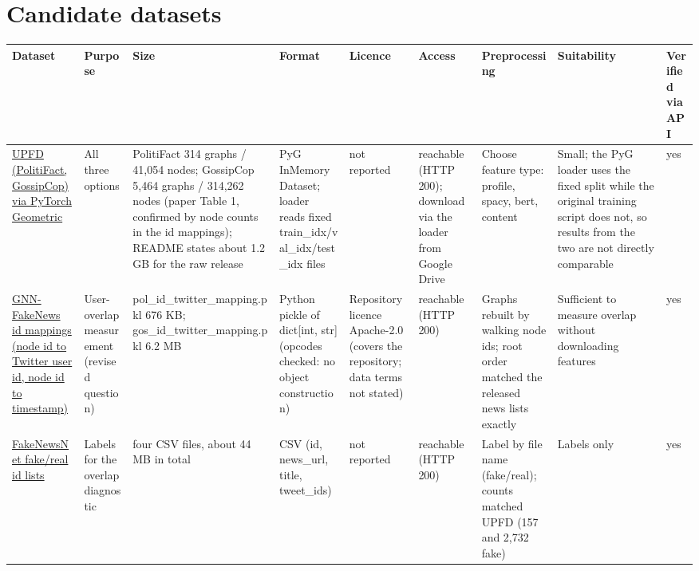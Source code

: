 \documentclass[11pt,a4paper]{article}
\begin{document}
\section{Candidate datasets}

{\small
\begin{longtable}{>{\raggedright\arraybackslash}p{}>{\raggedright\arraybackslash}p{}>{\raggedright\arraybackslash}p{}>{\raggedright\arraybackslash}p{}>{\raggedright\arraybackslash}p{}>{\raggedright\arraybackslash}p{}>{\raggedright\arraybackslash}p{}>{\raggedright\arraybackslash}p{}>{\raggedright\arraybackslash}p{}}
\toprule
\textbf{Dataset} & \textbf{Purpose} & \textbf{Size} & \textbf{Format} & \textbf{Licence} & \textbf{Access} & \textbf{Preprocessing} & \textbf{Suitability} & \textbf{Verified via API} \\
\midrule
\endhead
\href{https://pytorch-geometric.readthedocs.io/en/latest/generated/torch_geometric.datasets.UPFD.html}{UPFD (PolitiFact, GossipCop) via PyTorch Geometric} & All three options & PolitiFact 314 graphs / 41,054 nodes; GossipCop 5,464 graphs / 314,262 nodes (paper Table 1, confirmed by node counts in the id mappings); README states about 1.2 GB for the raw release & PyG InMemoryDataset; loader reads fixed train\_idx/val\_idx/test\_idx files & not reported & reachable (HTTP 200); download via the loader from Google Drive & Choose feature type: profile, spacy, bert, content & Small; the PyG loader uses the fixed split while the original training script does not, so results from the two are not directly comparable & yes \\
\href{https://github.com/safe-graph/GNN-FakeNews/tree/main/data}{GNN-FakeNews id mappings (node id to Twitter user id, node id to timestamp)} & User-overlap measurement (revised question) & pol\_id\_twitter\_mapping.pkl 676 KB; gos\_id\_twitter\_mapping.pkl 6.2 MB & Python pickle of dict[int, str] (opcodes checked: no object construction) & Repository licence Apache-2.0 (covers the repository; data terms not stated) & reachable (HTTP 200) & Graphs rebuilt by walking node ids; root order matched the released news lists exactly & Sufficient to measure overlap without downloading features & yes \\
\href{https://github.com/KaiDMML/FakeNewsNet/tree/master/dataset}{FakeNewsNet fake/real id lists} & Labels for the overlap diagnostic & four CSV files, about 44 MB in total & CSV (id, news\_url, title, tweet\_ids) & not reported & reachable (HTTP 200) & Label by file name (fake/real); counts matched UPFD (157 and 2,732 fake) & Labels only & yes \\
\bottomrule
\end{longtable}
}
\end{document}
